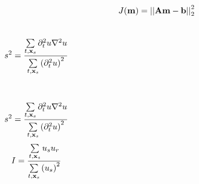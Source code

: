 \begin{frame}
  \[
    J({\bf m}) = \left|\left|{\bf A}{\bf m} -{\bf b}\right|\right|^{2}_{2}
  \]
\end{frame}

\begin{frame}
  \begin{columns}
      \[
        s^2 = \dfrac {\sum\limits_{t,{{\bf x}_s}} \partial_t^2 u  \nabla^2 u}{ \sum\limits_{t,{{\bf x}_s}} \left (\partial_t^2 u\right)^2}
      \]
  \end{columns}
\end{frame}

\begin{frame}
  \begin{columns}
      \[
         s^2 = \dfrac {\sum\limits_{t,{{\bf x}_s}} \partial_t^2 u  \nabla^2 u}{ \sum\limits_{t,{{\bf x}_s}} \left (\partial_t^2 u\right)^2}
      \]
      \[
        I = \dfrac {\sum\limits_{t,{{\bf x}_s}}  u_s  u_r}{ \sum\limits_{t,{{\bf x}_s}} \left ( u_s\right)^2}
      \]
  \end{columns}
\end{frame}



\begin{frame}
\end{frame}


\begin{frame}
\end{frame}
\begin{frame}
\end{frame}

\begin{frame}
\end{frame}




\begin{frame}
\end{frame}
\begin{frame}
\end{frame}
\begin{frame}
\end{frame}










